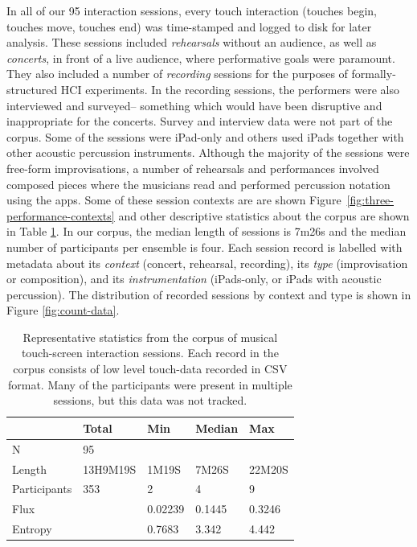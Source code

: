 \documentclass{sigchi}
\begin{document}
In all of our 95 interaction sessions, every touch interaction 
(touches begin, touches move, touches end) was time-stamped and
logged to disk for later analysis. These sessions included {\em rehearsals} without an
audience, as well as {\em concerts}, in front of a live audience, where 
performative goals were paramount. They also included a number of {\em
  recording} sessions
for the purposes of formally-structured HCI experiments. In the recording
sessions, the performers were also interviewed and surveyed-- something which would have 
been disruptive and inappropriate for the concerts. Survey and interview data were not part of the
corpus. 
Some of the sessions were
iPad-only and others used iPads together with other acoustic
percussion instruments. Although the majority of the sessions were
free-form improvisations, a number of rehearsals and performances
involved composed pieces where the musicians read and performed
percussion notation using the apps.
Some of these session contexts are are shown
Figure~\ref{fig:three-performance-contexts} and other descriptive
statistics about the corpus are shown in Table \ref{corpus-table}.
In our corpus, the median length of sessions is 7m26s and the median
number of participants per ensemble is four. Each session record is
labelled with metadata about its \emph{context} (concert,
rehearsal, recording), its \emph{type} (improvisation or composition),
and its \emph{instrumentation} (iPads-only, or iPads with acoustic
percussion). The distribution of recorded sessions by context and type
is shown in Figure \ref{fig:count-data}.

\begin{table}
\centering
\begin{tabular}{l|llll}
\hline
            & Total & Min  & Median   & Max     \\ 
\hline
N           & 95    &      &          &         \\
Length & 13H9M19S & 1M19S & 7M26S & 22M20S \\
Participants& 353   & 2    & 4        & 9        \\
Flux &   & 0.02239 & 0.1445 & 0.3246\\
Entropy &   & 0.7683 & 3.342 & 4.442\\          
\hline
\end{tabular}
\caption{
  Representative statistics from the corpus of musical touch-screen
  interaction sessions.  Each record in the corpus
  consists of low level touch-data recorded in CSV format. 
  Many of the participants were
  present in multiple sessions, but this data was not tracked.\label{corpus-table}}
\end{table}
\end{document}

